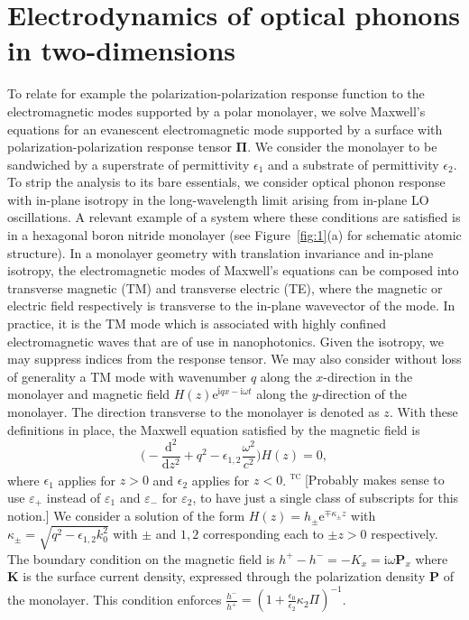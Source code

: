 \documentclass[aps,prb,twocolumn,
	           groupedaddress,superscriptaddress,
               amsfonts,amssymb,amsmath,floatfix,
	           citeautoscript]{revtex4-1}
\newcommand{\iu}{\mathrm{i}}
\newcommand{\e}{\mathrm{e}}
\newcommand{\dd}{\mathrm{d}}
\newcommand{\comment}[2]{%
    \ifbool{togglecomments}%
    {\textcolor{blue!70!black}{\small\textsf{%
    \textsuperscript{\textsc{\textsf{\MakeLowercase{#1}}}}%
    [#2]}}} %
    {}}     %
\begin{document}
\section{Electrodynamics of optical phonons in two-dimensions}
To relate for example the polarization-polarization response function  to the electromagnetic modes supported by a polar monolayer, we solve Maxwell's equations for an evanescent electromagnetic mode supported by a surface with polarization-polarization response tensor $\mathbf{\Pi}$. We consider the monolayer to be sandwiched by a superstrate of permittivity $\epsilon_1$ and a substrate of permittivity $\epsilon_2$. To strip the analysis to its bare essentials, we consider optical phonon response with in-plane isotropy in the long-wavelength limit arising from in-plane LO oscillations. A relevant example of a system where these conditions are satisfied is in a hexagonal boron nitride monolayer (see Figure~\ref{fig:1}(a) for schematic atomic structure). In a monolayer geometry with translation invariance and in-plane isotropy, the electromagnetic modes of Maxwell's equations can be composed into transverse magnetic (TM) and transverse electric (TE), where the magnetic or electric field respectively is transverse to the in-plane wavevector of the mode. In practice, it is the TM mode which is associated with highly confined electromagnetic waves that are of use in nanophotonics.  Given the isotropy, we may suppress indices from the response tensor. We may also consider without loss of generality a TM mode with wavenumber $q$ along the $x$-direction in the monolayer and magnetic field $H(z)\e^{\iu qx-\iu\omega t}$ along the $y$-direction of the monolayer. The direction transverse to the monolayer is denoted as $z$.  With these definitions in place, the Maxwell equation satisfied by the magnetic field is 
\begin{equation}\label{eq:2dmaxwell}
    \bigg(-\frac{\dd^2}{\dd{}z^2}+q^2-\epsilon_{1,2}\frac{\omega^2}{c^2} \bigg)H(z) = 0,
\end{equation}
where $\epsilon_1$ applies for $z>0$ and $\epsilon_2$ applies for $z<0$.
\comment{tc}{Probably makes sense to use $\varepsilon_+$ instead of $\varepsilon_1$ and $\varepsilon_-$ for $\varepsilon_2$, to have just a single class of subscripts for this notion.}
We consider a solution of the form $H(z) = h_\pm\e^{\mp\kappa_\pm z}$ with $\kappa_\pm = \sqrt{q^2-\epsilon_{1,2} k_0^2}$ with $\pm$ and $1,2$ corresponding each to $\pm z > 0$ respectively.  The boundary condition on the magnetic field is $h^+-h^- = -K_x = \iu\omega\mathbf{P}_x$ where $\mathbf{K}$ is the surface current density, expressed through the polarization density $\mathbf{P}$ of the monolayer.  This condition enforces $\frac{h^-}{h^+} =(1+\frac{\epsilon_0}{\epsilon_2} \kappa_2\Pi)^{-1}$. 
\end{document}
